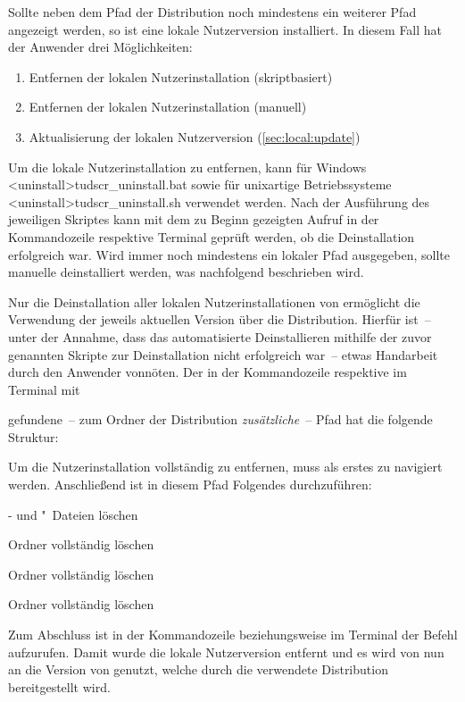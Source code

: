 Sollte neben dem Pfad der Distribution noch mindestens ein weiterer Pfad 
angezeigt werden, so ist eine lokale Nutzerversion installiert. In 
diesem Fall hat der Anwender drei Möglichkeiten:
%
\begin{enumerate}
\item Entfernen der lokalen Nutzerinstallation (skriptbasiert)
\item Entfernen der lokalen Nutzerinstallation (manuell)
\item Aktualisierung der lokalen Nutzerversion (\autoref{sec:local:update})
\end{enumerate}
%
Um die lokale Nutzerinstallation zu entfernen, kann für Windows
\GitHubDownload<uninstall>{tudscr_uninstall.bat} sowie für unixartige 
Betriebssysteme \GitHubDownload<uninstall>{tudscr_uninstall.sh} verwendet 
werden. Nach der Ausführung des jeweiligen Skriptes kann mit dem zu Beginn 
gezeigten Aufruf in der Kommandozeile respektive Terminal geprüft werden, ob 
die Deinstallation erfolgreich war. Wird immer noch mindestens ein lokaler Pfad 
ausgegeben, sollte \TUDScript manuelle deinstalliert werden, was nachfolgend 
beschrieben wird.

Nur die Deinstallation aller lokalen Nutzerinstallationen von \TUDScript 
ermöglicht die Verwendung der jeweils aktuellen Version über die Distribution. 
Hierfür ist~-- unter der Annahme, dass das automatisierte Deinstallieren 
mithilfe der zuvor genannten Skripte zur Deinstallation nicht erfolgreich 
war~-- etwas Handarbeit durch den Anwender vonnöten. Der in der Kommandozeile 
respektive im Terminal mit
%
\begin{quoting}
\end{quoting}
%
gefundene~-- zum Ordner der Distribution \emph{zusätzliche}~-- Pfad hat die 
folgende Struktur:
%
\begin{quoting}
\end{quoting}
%
Um die Nutzerinstallation vollständig zu entfernen, muss als erstes zu 
 navigiert werden. Anschließend ist in diesem 
Pfad Folgendes durchzuführen:
%
\settowidth{}%
\begin{description}[labelwidth=\tempdim,labelsep=1em]
\item[\Path{tex/latex/tudscr/}]- und "~Dateien löschen
\item[\Path{tex/latex/tudscr/}]Ordner  vollständig löschen
\item[\Path{doc/latex/}] Ordner  vollständig löschen
\item[\Path{source/latex/}] Ordner  vollständig löschen
\end{description}
%
Zum Abschluss ist in der Kommandozeile beziehungsweise im Terminal der Befehl 
 aufzurufen. Damit wurde die lokale Nutzerversion entfernt und es 
wird von nun an die Version von \TUDScript genutzt, welche durch die verwendete 
Distribution bereitgestellt wird.




